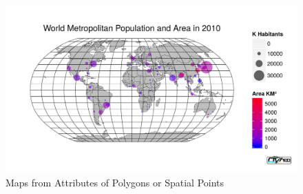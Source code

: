\documentclass[a4paper,10pt]{article}
\begin{document}
\begin{figure}
  \centering
    \includegraphics[width=1\textwidth]{point_pj}
  \caption{Maps from Attributes of Polygons or Spatial Points}
  \label{fig:point_prj}
\end{figure}
\end{document}
